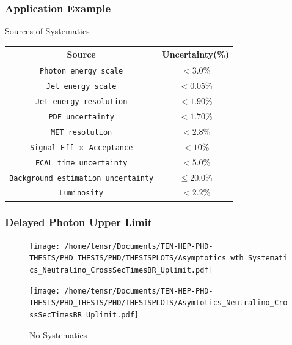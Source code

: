 \documentclass[12pt]{beamer}
\begin{document}
\begin{frame}
\frametitle{Application Example}
 \begin{varblock}[7.5cm]{Sources of Systematics}
  \begin{tabular}{c c}
  \hline
  \bfseries{Source} & \bfseries {Uncertainty(\%)}\\
  \hline
  \texttt{Photon energy scale}  & $< 3.0$\% \\
  \texttt{Jet energy scale}  & $< 0.05$\% \\
  \texttt{Jet energy resolution} &$ < 1.90$\% \\
  \texttt{PDF uncertainty} & $< 1.70$\% \\
  \texttt{MET resolution} & $ <2.8$\%  \\
  \texttt{Signal Eff $\times$ Acceptance}   &  $< 10$\% \\
  \texttt{ECAL time uncertainty} & $<5.0$\% \\
  \hline
  \texttt{Background estimation uncertainty} &$ \leq 20.0$\% \\
  \hline 
  \texttt{Luminosity}  & $< 2.2$\% \\
  \hline
  \end{tabular}
  \end{varblock}
 \end{frame}



\begin{frame}
\frametitle{Delayed Photon Upper Limit}
\begin{figure}[ht]
\begin{minipage}[b]{0.45\linewidth}
\centering
\texttt{[image: /home/tensr/Documents/TEN-HEP-PHD-THESIS/PHD\_THESIS/PHD/THESISPLOTS/Asymptotics\_wth\_Systematics\_Neutralino\_CrossSecTimesBR\_Uplimit.pdf]}
\caption{Systematics Inc.}
\label{fig:SUSY UL}
\end{minipage}
 \hspace{0.1cm}
 \begin{minipage}[b]{0.45\linewidth}
\texttt{[image: /home/tensr/Documents/TEN-HEP-PHD-THESIS/PHD\_THESIS/PHD/THESISPLOTS/Asymtotics\_Neutralino\_CrossSecTimesBR\_Uplimit.pdf]}
\caption{No Systematics}
\label{fig:SUSY UL}
 \end{minipage}
\end{figure}
\end{frame}
\end{document}
